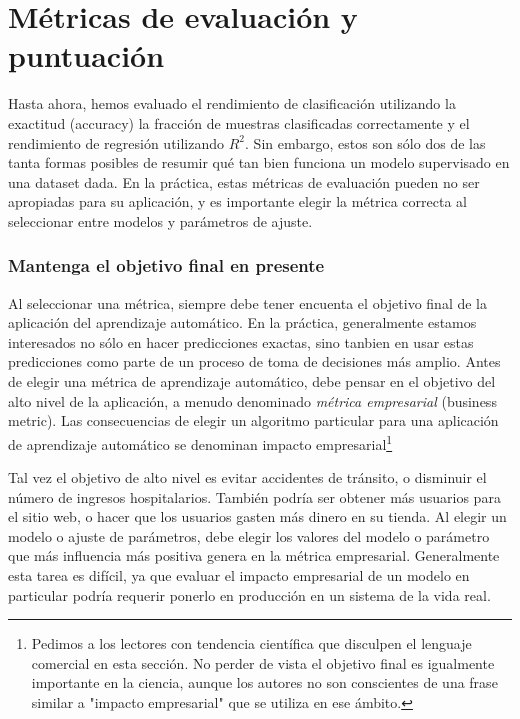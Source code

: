 {\section{Métricas de evaluación y puntuación}

Hasta ahora, hemos evaluado el rendimiento de clasificación utilizando la exactitud (accuracy) la fracción de muestras clasificadas correctamente  y el rendimiento de regresión utilizando $R^{2}$. 
 Sin embargo, estos son sólo dos de las tanta formas posibles de resumir qué tan bien funciona un modelo supervisado en una  dataset dada. En la práctica, estas métricas de evaluación pueden no ser apropiadas  para su aplicación, y es importante elegir la métrica correcta al seleccionar entre modelos y parámetros de ajuste.


\subsubsection{Mantenga el objetivo final en presente}

Al seleccionar una métrica, siempre debe tener encuenta el objetivo final de la aplicación  del aprendizaje automático.  En la práctica, generalmente estamos interesados no sólo en hacer predicciones exactas, sino tanbien en  usar estas predicciones como parte de un proceso de toma de decisiones más amplio. Antes de elegir una métrica de aprendizaje automático, debe pensar en el objetivo del alto nivel de la aplicación, a menudo denominado \emph{métrica empresarial} (business metric).   Las  consecuencias de elegir un algoritmo particular para una aplicación de aprendizaje automático se denominan {\ttfamily impacto empresarial}\footnote{\scriptsize	  Pedimos a los lectores con tendencia científica que disculpen el lenguaje comercial en esta sección. No perder de vista el objetivo final es igualmente importante en la ciencia, aunque los autores no son conscientes de una frase similar a "{}impacto empresarial"{} que se utiliza en ese ámbito.}   %

Tal vez el objetivo de alto nivel es evitar accidentes de tránsito, o disminuir el número de 
ingresos hospitalarios. También podría ser obtener más usuarios para el sitio web, o hacer
 que los usuarios gasten más dinero en su tienda.   Al elegir un  modelo o ajuste de 
 parámetros, debe elegir los valores del modelo o parámetro que más influencia más positiva 
 genera  en la métrica empresarial.  Generalmente esta tarea es difícil, ya que evaluar el impacto empresarial de un modelo en particular podría requerir ponerlo en producción en un sistema de la vida real.\\


}
